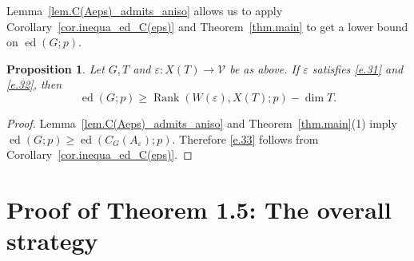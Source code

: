 \documentclass[12pt]{amsart}
\numberwithin{equation}{section}
\newtheorem{proposition}[theorem]{Proposition}
\theoremstyle{definition}
\newcommand{\cV}{\mathcal{V}}
\newcommand{\ed}{\operatorname{ed}}
\newcommand{\SymRank}{\operatorname{Rank}}
\newcommand{\eps}{\varepsilon}
\begin{document}
Lemma~\ref{lem.C(Aeps)_admits_aniso} allows us to apply Corollary~\ref{cor.inequa_ed_C(eps)} and Theorem~\ref{thm.main} to get a lower bound on $\ed(G;p)$.
\begin{proposition}\label{prop.sym_rank_lower}
    Let $G,T$ and $\eps: X(T)\to \cV$ be as above. If $\eps$ satisfies \eqref{e.31} and \eqref{e.32}, then
        \begin{equation}\label{e.33}
        \ed(G;p) \geq \SymRank(W(\eps),X(T);p) - \dim T.
        \end{equation}
\end{proposition}
\begin{proof}
Lemma~\ref{lem.C(Aeps)_admits_aniso} and Theorem~\ref{thm.main}(1) imply $\ed(G;p) \geq \ed( C_G(A_\eps);p)$. Therefore \eqref{e.33} follows from Corollary~\ref{cor.inequa_ed_C(eps)}.
\end{proof}

\section{Proof of Theorem 1.5: The overall strategy}\label{sect.setup_computations}
\end{document}
